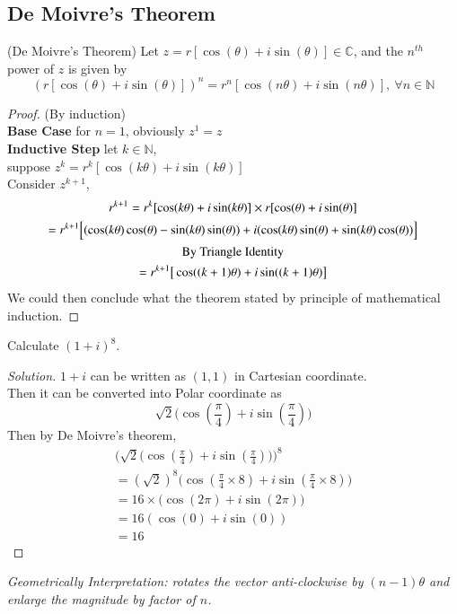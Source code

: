 \documentclass[10pt]{article}
\begin{document}
		\subsection{De Moivre's Theorem}
		\begin{theorem}(De Moivre's Theorem)
			Let $z = r[\cos(\theta) + i \sin(\theta)] \in \mathbb{C}$, and the $n^{th}$ power of $z$ is given by
			\[
				(r[\cos(\theta) + i \sin(\theta)])^n = r^n [\cos(n\theta) + i \sin(n \theta)],\ \forall n \in \mathbb{N}
			\]
		\end{theorem}
		\begin{proof}
			(By induction) \\
			\textbf{Base Case} for $n=1$, obviously $z^1 = z$ \\
			\textbf{Inductive Step} let $k \in \mathbb{N}$, \\
			suppose $z^k = r^k [\cos(k \theta) + i \sin(k \theta)]$ \\
			Consider $z^{k+1}$, \\
			\begin{gather*}
				r^{k+1} = r^k [\cos(k \theta) + i \sin(k \theta)] \times r[\cos(\theta) + i \sin(\theta)] \\
				= r^{k+1} \Big[
					(\cos(k \theta) \cos(\theta) - \sin (k \theta) \sin(\theta)) + 
					i (\cos(k \theta) \sin(\theta) + \sin(k \theta) \cos(\theta))
				\Big] \\
				\text{{By Triangle Identity}} \\
				= r^{k+1} \big[ \cos((k+1)\theta) + i \sin((k+1) \theta) \big ]
			\end{gather*}
			We could then conclude what the theorem stated by principle of mathematical induction.
		\end{proof}
		
		\begin{example}
			Calculate $(1+i)^8$. 
			\begin{proof}[Solution]
				$1+i$ can be written as $(1,1)$ in Cartesian coordinate. \\
				Then it can be converted into Polar coordinate as 
				\[
					\sqrt{2} \Big ( \cos(\frac{\pi}{4}) + i \sin(\frac{\pi}{4})\Big)
				\]
				Then by De Moivre's theorem,
				\begin{gather*}
					\Big( \sqrt{2} \Big ( \cos(\frac{\pi}{4}) + i \sin(\frac{\pi}{4})\Big) \Big)^8 \\
					= (\sqrt{2})^8 \Big ( \cos(\frac{\pi}{4} \times 8) + i \sin(\frac{\pi}{4} \times 8)\Big) \\
					= 16 \times \Big ( \cos(2\pi) + i \sin(2\pi)\Big) \\
					= 16 (\cos(0) + i \sin(0)) \\
					= 16
				\end{gather*}
			\end{proof}
			\emph{Geometrically Interpretation: rotates the vector anti-clockwise by $(n-1)\theta$ and enlarge the magnitude by factor of $n$.}
		\end{example}
		
\end{document}
